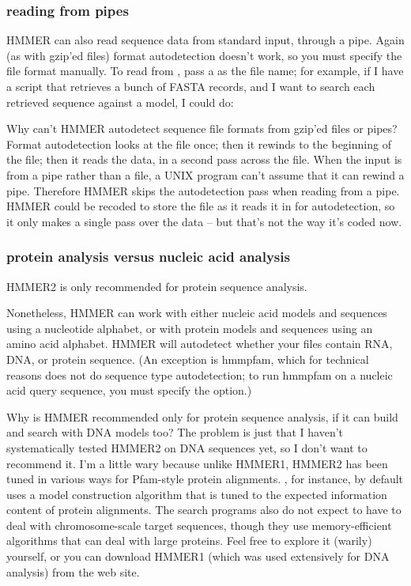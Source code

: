 \subsubsection{reading from pipes}

HMMER can also read sequence data from standard input, through a pipe.
Again (as with gzip'ed files) format autodetection doesn't work, so
you must specify the file format manually. To read from ,
pass a \prog{-} as the file name; for example, if I have a script that
retrieves a bunch of FASTA records, and I want to search each
retrieved sequence against a model, I could do:


\begin{srefaq}{Why can't HMMER autodetect sequence file formats from
gzip'ed files or pipes?}
Format autodetection looks at the file once; then it rewinds to the
beginning of the file; then it reads the data, in a second pass across
the file. When the input is from a pipe rather than a file, a UNIX
program can't assume that it can rewind a pipe. Therefore HMMER skips the
autodetection pass when reading from a pipe.  HMMER could be recoded to store the file as it
reads it in for autodetection, so it only makes a single pass over the
data -- but that's not the way it's coded now.
\end{srefaq}

\subsubsection{protein analysis versus nucleic acid analysis}

HMMER2 is only recommended for protein sequence analysis.

Nonetheless, HMMER can work with either nucleic acid models and
sequences using a nucleotide alphabet, or with protein models and
sequences using an amino acid alphabet.  HMMER will autodetect whether
your files contain RNA, DNA, or protein sequence. (An exception is
hmmpfam, which for technical reasons does not do sequence type
autodetection; to run hmmpfam on a nucleic acid query sequence, you
must specify the  option.)

\begin{srefaq}{Why is HMMER recommended only for protein sequence
analysis, if it can build and search with DNA models too?}  The
problem is just that I haven't systematically tested HMMER2 on DNA
sequences yet, so I don't want to recommend it. I'm a little wary
because unlike HMMER1, HMMER2 has been tuned in various ways for
Pfam-style protein alignments. , for instance, by
default uses a model construction algorithm that is tuned to the
expected information content of protein alignments. The search
programs also do not expect to have to deal with chromosome-scale
target sequences, though they use memory-efficient algorithms that can
deal with large proteins.  Feel free to explore it (warily) yourself,
or you can download HMMER1 (which was used extensively for DNA
analysis) from the web site.
\end{srefaq}

